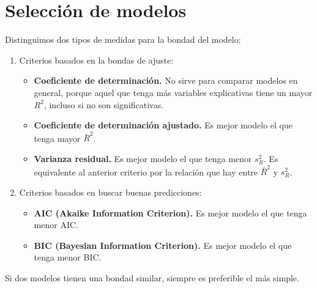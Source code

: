 \documentclass{report}
\theoremstyle{remark}
\theoremstyle{remark}
\theoremstyle{remark}
\theoremstyle{definition}
\theoremstyle{definition}
\theoremstyle{definition}
\begin{document}
\section{Selección de modelos}
Distinguimos dos tipos de medidas para la bondad del modelo:
\begin{enumerate}
    \item Criterios basados en la bondas de ajuste:
          \begin{itemize}
              \item \textbf{Coeficiente de determinación.}
                    No sirve para comparar modelos en general, porque aquel que tenga más variables explicativas tiene un mayor $R^2$, incluso si no son significativas.
              \item \textbf{Coeficiente de determinación ajustado.}
                    Es mejor modelo el que tenga mayor $\bar{R}^2$.
              \item \textbf{Varianza residual.}
                    Es mejor modelo el que tenga menor $s_R^2$.
                    Es equivalente al anterior criterio por la relación que hay entre $\bar{R}^2$ y $s_R^2$.
          \end{itemize}
    \item Criterios basados en buscar buenas predicciones:
          \begin{itemize}
              \item \textbf{AIC (Akaike Information Criterion).}
                    Es mejor modelo el que tenga menor AIC.
              \item \textbf{BIC (Bayesian Information Criterion).}
                    Es mejor modelo el que tenga menor BIC.
          \end{itemize}
\end{enumerate}

Si dos modelos tienen una bondad similar, siempre es preferible el más simple.
\end{document}
